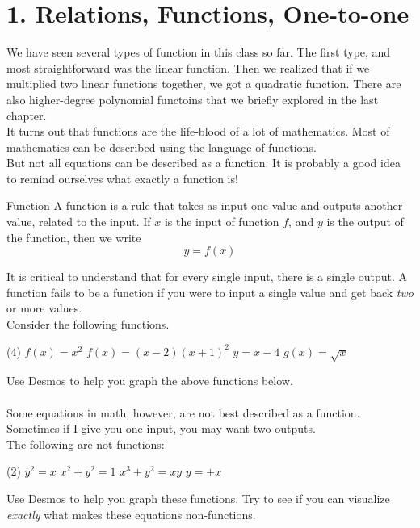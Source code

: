 \documentclass[12pt,fleqn]{book}
\begin{document}
\chapter{1. Relations, Functions, One-to-one}
We have seen several types of function in this class so far.  The first type, and most straightforward was the linear function.  Then we realized that if we multiplied two linear functions together, we got a quadratic function.  There are also higher-degree polynomial functoins that we briefly explored in the last chapter.
\\[1em]
It turns out that functions are the life-blood of a lot of mathematics.  Most of mathematics can be described using the language of functions.
\\[1em]
But not all equations can be described as a function.  It is probably a  good idea to remind ourselves what exactly a function is!
\begin{defn}{Function}{}
    A function is a rule that takes as input one value and outputs another value, related to the input.  If $x$ is the input of function $f$, and $y$ is the output of the function, then we write
    \[
        y=f(x)
    \]
\end{defn}
It is critical to understand that for every single input, there is a single output.  A function fails to be a function if you were to input a single value and get back \emph{two} or more values.
\\[1em]
Consider the following functions.
\begin{tasks}(4)
    \task
    $f(x)=x^2$
    \task
    $f(x)=(x-2)(x+1)^2$
    \task
    $y=x-4$
    \task
    $g(x)=\sqrt x$
\end{tasks}
Use Desmos to help you graph the above functions below.
\\[1em]
\\[1em]
Some equations in math, however, are not best described as a function.  Sometimes if I give you one input, you may want two outputs.
\\[1em]
The following are not functions:
\begin{tasks}(2)
    \task
    $y^2=x$
    \task
    $x^2+y^2=1$
    \task
    $x^3+y^2=xy$
    \task
    $y=\pm x$
\end{tasks}
Use Desmos to help you graph these functions.  Try to see if you can visualize \emph{exactly} what makes these equations non-functions.
\\[1em]
\end{document}

